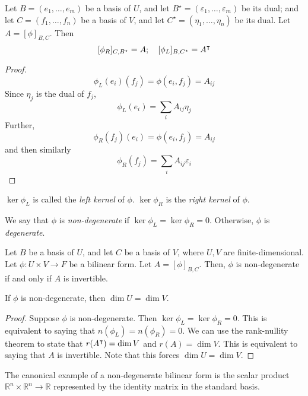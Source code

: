 \begin{lemma}
	Let \( B = (e_1, \dots, e_m) \) be a basis of \( U \), and let \( B^\star = (\varepsilon_1, \dots, \varepsilon_m) \) be its dual; and let \( C = (f_1, \dots, f_n) \) be a basis of \( V \), and let \( C^\star = (\eta_1, \dots, \eta_n) \) be its dual.
	Let \( A = [\phi]_{B,C} \).
	Then
	\[
		[\phi_R]_{C, B^\star} = A;\quad [\phi_L]_{B, C^\star} = A^\intercal
	\]
\end{lemma}
\begin{proof}
	\[
		\phi_L(e_i)(f_j) = \phi(e_i, f_j) = A_{ij}
	\]
	Since \( \eta_j \) is the dual of \( f_j \),
	\[
		\phi_L(e_i) = \sum_i A_{ij} \eta_j
	\]
	Further,
	\[
		\phi_R(f_j)(e_i) = \phi(e_i, f_j) = A_{ij}
	\]
	and then similarly
	\[
		\phi_R(f_j) = \sum_i A_{ij} \varepsilon_i
	\]
\end{proof}
\begin{definition}
	\( \ker \phi_L \) is called the \textit{left kernel} of \( \phi \).
	\( \ker \phi_R \) is the \textit{right kernel} of \( \phi \).
\end{definition}
\begin{definition}
	We say that \( \phi \) is \textit{non-degenerate} if \( \ker \phi_L = \ker \phi_R = \qty{0} \).
	Otherwise, \( \phi \) is \textit{degenerate}.
\end{definition}
\begin{theorem}
	Let \( B \) be a basis of \( U \), and let \( C \) be a basis of \( V \), where \( U, V \) are finite-dimensional.
	Let \( \phi \colon U \times V \to F \) be a bilinear form.
	Let \( A = [\phi]_{B,C} \).
	Then, \( \phi \) is non-degenerate if and only if \( A \) is invertible.
\end{theorem}
\begin{corollary}
	If \( \phi \) is non-degenerate, then \( \dim U = \dim V \).
\end{corollary}
\begin{proof}
	Suppose \( \phi \) is non-degenerate.
	Then \( \ker \phi_L = \ker \phi_R = \qty{0} \).
	This is equivalent to saying that \( n(\phi_L) = n(\phi_R) = 0 \).
	We can use the rank-nullity theorem to state that \( r(A^\intercal) = \dim V \) and \( r(A) = \dim V \).
	This is equivalent to saying that \( A \) is invertible.
	Note that this forces \( \dim U = \dim V \).
\end{proof}
\begin{remark}
	The canonical example of a non-degenerate bilinear form is the scalar product \( \mathbb R^n \times \mathbb R^n \to \mathbb R \) represented by the identity matrix in the standard basis.
\end{remark}
